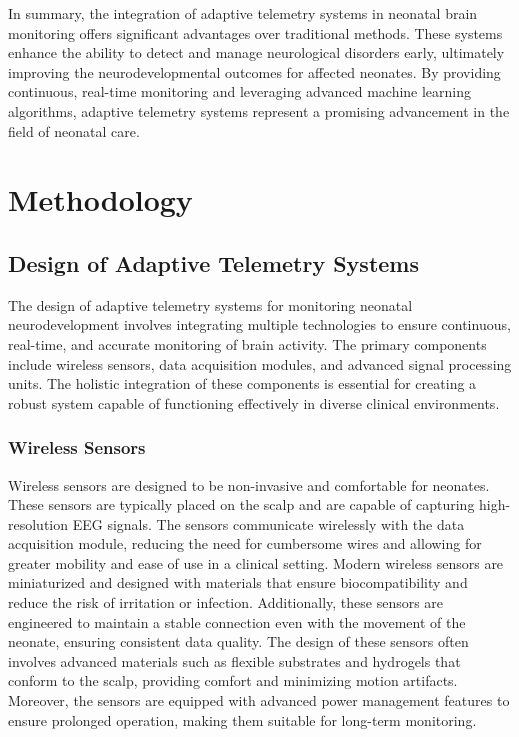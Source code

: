 \documentclass[12pt,journal,compsoc]{IEEEtran}
\begin{document}
In summary, the integration of adaptive telemetry systems in neonatal brain monitoring offers significant advantages over traditional methods. These systems enhance the ability to detect and manage neurological disorders early, ultimately improving the neurodevelopmental outcomes for affected neonates. By providing continuous, real-time monitoring and leveraging advanced machine learning algorithms, adaptive telemetry systems represent a promising advancement in the field of neonatal care.

\section{Methodology}

\subsection{Design of Adaptive Telemetry Systems}

The design of adaptive telemetry systems for monitoring neonatal neurodevelopment involves integrating multiple technologies to ensure continuous, real-time, and accurate monitoring of brain activity. The primary components include wireless sensors, data acquisition modules, and advanced signal processing units. The holistic integration of these components is essential for creating a robust system capable of functioning effectively in diverse clinical environments.

\subsubsection{Wireless Sensors}

Wireless sensors are designed to be non-invasive and comfortable for neonates. These sensors are typically placed on the scalp and are capable of capturing high-resolution EEG signals. The sensors communicate wirelessly with the data acquisition module, reducing the need for cumbersome wires and allowing for greater mobility and ease of use in a clinical setting. Modern wireless sensors are miniaturized and designed with materials that ensure biocompatibility and reduce the risk of irritation or infection. Additionally, these sensors are engineered to maintain a stable connection even with the movement of the neonate, ensuring consistent data quality. The design of these sensors often involves advanced materials such as flexible substrates and hydrogels that conform to the scalp, providing comfort and minimizing motion artifacts. Moreover, the sensors are equipped with advanced power management features to ensure prolonged operation, making them suitable for long-term monitoring.
\end{document}
